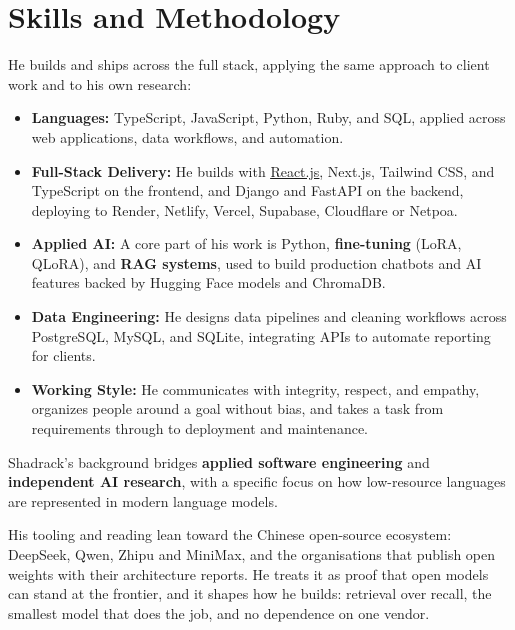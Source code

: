 \documentclass[12pt]{article}
\newcommand{\hlink}[2]{\href{#1}{\textcolor{linkblue}{\underline{#2}}}}
\begin{document}
\section*{Skills and Methodology}
\noindent He builds and ships across the full stack, applying the same approach to client work and to his own research:

\begin{itemize}
    \item \textbf{Languages:} TypeScript, JavaScript, Python, Ruby, and SQL, applied across web applications, data workflows, and automation.
    \item \textbf{Full-Stack Delivery:} He builds with \hlink{https://react.dev}{React.js}, Next.js, Tailwind CSS, and TypeScript on the frontend, and Django and FastAPI on the backend, deploying to Render, Netlify, Vercel, Supabase, Cloudflare or Netpoa.
    \item \textbf{Applied AI:} A core part of his work is Python, \textbf{fine-tuning} (LoRA, QLoRA), and \textbf{RAG systems}, used to build production chatbots and AI features backed by Hugging Face models and ChromaDB.
    \item \textbf{Data Engineering:} He designs data pipelines and cleaning workflows across PostgreSQL, MySQL, and SQLite, integrating APIs to automate reporting for clients.
    \item \textbf{Working Style:} He communicates with integrity, respect, and empathy, organizes people around a goal without bias, and takes a task from requirements through to deployment and maintenance.
\end{itemize}

\noindent Shadrack's background bridges \textbf{applied software engineering} and \textbf{independent AI research}, with a specific focus on how low-resource languages are represented in modern language models.

\vspace{6pt}
\noindent His tooling and reading lean toward the Chinese open-source ecosystem: DeepSeek, Qwen, Zhipu and MiniMax, and the organisations that publish open weights with their architecture reports. He treats it as proof that open models can stand at the frontier, and it shapes how he builds: retrieval over recall, the smallest model that does the job, and no dependence on one vendor.
\end{document}
